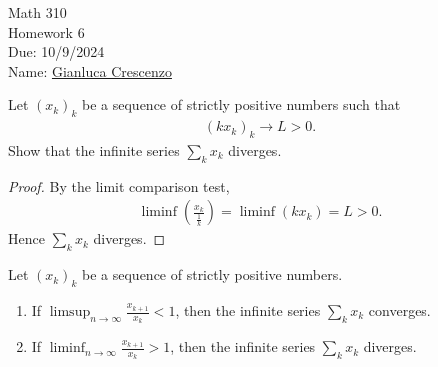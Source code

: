 \documentclass[10pt,twoside,openany]{memoir}
\begin{document}
\begin{center}
    { \Large Math 310 \\[0.1in]Homework 6 \\[0.1in]
    Due: 10/9/2024}\\[.25in]
    { Name:} {\underline{Gianluca Crescenzo\hspace*{2in}}}\\[0.15in]
    \end{center}
    \vspace{4pt}
    \begin{exercise}
        Let $(x_k)_k$ be a sequence of strictly positive numbers such that  
            \begin{equation*}
            \begin{split}
                (kx_k)_k \rightarrow L > 0.
            \end{split}
            \end{equation*}
        Show that the infinite series $\sum_{k}x_k$ diverges.
    \end{exercise}
        \begin{proof}
            By the limit comparison test,
                \begin{equation*}
                \begin{split}
                    \liminf \left(\frac{x_k}{\frac{1}{k}}\right) = \liminf(kx_k) = L > 0.
                \end{split}
                \end{equation*}
            Hence $\sum_k x_k$ diverges.
        \end{proof}
    \begin{exercise}
        Let $(x_k)_k$ be a sequence of strictly positive numbers.
            \begin{enumerate}[label = (\roman*)]
                \item If $\limsup_{n \rightarrow \infty}\frac{x_{k+1}}{x_k} < 1$, then the infinite series $\sum_k x_k$ converges.
                \item If $\liminf_{n \rightarrow \infty} \frac{x_{k+1}}{x_k} > 1$, then the infinite series $\sum_k x_k$ diverges.
            \end{enumerate}
    \end{exercise}
\end{document}
